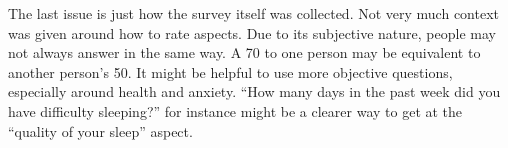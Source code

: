 \documentclass[
]{article}
\begin{document}
The last issue is just how the survey itself was collected. Not very
much context was given around how to rate aspects. Due to its subjective
nature, people may not always answer in the same way. A 70 to one person
may be equivalent to another person's 50. It might be helpful to use
more objective questions, especially around health and anxiety. ``How
many days in the past week did you have difficulty sleeping?'' for
instance might be a clearer way to get at the ``quality of your sleep''
aspect.
\end{document}
